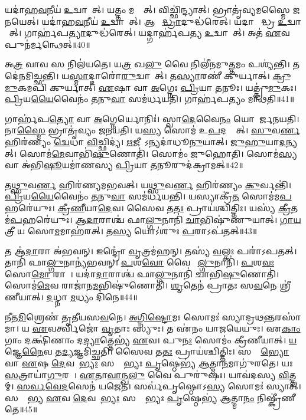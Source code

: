 𑌯𑌦𑌾॑𑌹\ul{𑌵}𑌨𑍀𑌯॑ \ul{𑌉}𑌦𑍍𑌵𑌾𑌯𑍇᳚𑌤𑍍।
𑌯𑌤𑍍𑌤𑌂 𑌮𑌨𑍍𑌥𑍇᳚𑌤𑍍।
𑌵𑌿𑌚𑍍𑌛𑌿॑𑌨𑍍𑌦𑍍𑌯𑌾𑌤𑍍।
𑌭𑍍𑌰𑌾𑌤𑍃॑𑌵𑍍𑌯𑌮𑌸𑍍𑌮𑍈 𑌜𑌨𑌯𑍇𑌤𑍍।
𑌯𑌦𑌾॑𑌹\ul{𑌵}𑌨𑍀𑌯॑ \ul{𑌉}𑌦𑍍𑌵𑌾𑌯𑍇᳚𑌤𑍍।
𑌆𑌗𑍍𑌨𑍀᳚\ul{𑌦𑍍𑌧𑍍𑌰𑌾}𑌦𑍁𑌦𑍍𑌧॑\-𑌰𑍇𑌤𑍍।
𑌯𑌦𑌾𑌗𑍍𑌨𑍀᳚𑌦𑍍𑌧𑍍𑌰 \ul{𑌉}𑌦𑍍𑌵𑌾𑌯𑍇᳚𑌤𑍍।
𑌗𑌾𑌰𑍍\mbox{}𑌹॑𑌪\ul{𑌤𑍍𑌯𑌾}𑌦𑍁𑌦𑍍𑌧॑𑌰𑍇𑌤𑍍।
𑌯𑌦𑍍𑌗𑌾𑌰𑍍\mbox{}𑌹॑𑌪𑌤𑍍𑌯 \ul{𑌉}𑌦𑍍𑌵𑌾𑌯𑍇᳚𑌤𑍍।
𑌅𑌤॑ \ul{𑌏}𑌵 𑌪𑍁𑌨॑𑌰𑍍𑌮𑌨𑍍𑌥𑍇𑌤𑍍॥40॥

𑌅\ul{𑌤𑍍𑌰} 𑌵𑌾𑌵 𑌸 𑌨𑌿𑌲॑𑌯𑌤𑍇।
𑌯\ul{𑌤𑍍𑌰} 𑌖\ul{𑌲𑍁} 𑌵𑍈 𑌨𑌿𑌲𑍀॑𑌨𑌮𑍁\ul{𑌤𑍍𑌤}𑌮𑌂 𑌪𑌶𑍍𑌯॑𑌨𑍍𑌤𑌿।
𑌤𑌦𑍇॑𑌨𑌮𑌿𑌚𑍍𑌛𑌨𑍍𑌤𑌿।
𑌯\ul{𑌸𑍍𑌮𑌾}𑌦𑍍𑌦𑌾𑌰𑍋॑\ul{𑌰𑍁}𑌦𑍍𑌵𑌾𑌯𑍇᳚𑌤𑍍।
𑌤\ul{𑌸𑍍𑌯𑌾}𑌰𑌣𑍀॑ 𑌕𑍁𑌰𑍍𑌯𑌾𑌤𑍍।
\ul{𑌕𑍍𑌰𑍁}\ul{𑌮𑍁}𑌕𑌮𑌪𑌿॑ 𑌕𑍁𑌰𑍍𑌯𑌾𑌤𑍍।
\ul{𑌏}𑌷𑌾 𑌵𑌾 \ul{𑌅}𑌗𑍍𑌨𑍇𑌃 \ul{𑌪𑍍𑌰𑌿}𑌯𑌾 \ul{𑌤}𑌨𑍂𑌃।
𑌯𑌤𑍍𑌕𑍍𑌰𑍁॑\ul{𑌮𑍁}𑌕𑌃।
\ul{𑌪𑍍𑌰𑌿}𑌯\ul{𑌯𑍈}𑌵𑍈𑌨𑌂॑ \ul{𑌤}𑌨𑍁\ul{𑌵𑌾} 𑌸𑌮॑𑌰𑍍𑌧𑌯𑌤𑌿।
𑌗𑌾𑌰𑍍\mbox{}𑌹॑𑌪𑌤𑍍𑌯𑌂 𑌮𑌨𑍍𑌥𑌤𑌿॥41॥

𑌗𑌾𑌰𑍍\mbox{}𑌹॑𑌪\ul{𑌤𑍍𑌯𑍋} 𑌵𑌾 \ul{𑌅}𑌗𑍍𑌨𑍇𑌰𑍍𑌯𑍋𑌨𑌿𑌃॑।
𑌸𑍍𑌵𑌾\ul{𑌦𑍇}𑌵𑍈\ul{𑌨𑌂} 𑌯𑍋𑌨𑍇᳚𑌰𑍍𑌜𑌨𑌯𑌤𑌿।
𑌨𑌾\ul{𑌸𑍍𑌮𑍈} 𑌭𑍍𑌰𑌾𑌤𑍃॑𑌵𑍍𑌯𑌂 𑌜𑌨𑌯𑌤𑌿।
𑌯\ul{𑌸𑍍𑌯} 𑌸𑍋𑌮॑ 𑌉\ul{𑌪}𑌦𑌸𑍍𑌯𑍇᳚𑌤𑍍।
\ul{𑌸𑍁}𑌵\ul{𑌰𑍍𑌣}\ul{} 𑌹𑌿𑌰॑𑌣𑍍𑌯𑌂 \ul{𑌦𑍍𑌵𑍇}𑌧𑌾 \ul{𑌵𑌿}𑌚𑍍𑌛𑌿𑌦𑍍𑌯॑।
\ul{𑌋}\ul{𑌜𑍀}𑌷𑍇᳚\-𑌽𑌨𑍍𑌯𑌦𑌾॑𑌧𑍂\ul{𑌨𑍁}𑌯𑌾𑌤𑍍।
\ul{𑌜𑍁}\ul{𑌹𑍁}𑌯𑌾\ul{𑌦}𑌨𑍍𑌯𑌤𑍍।
𑌸𑍋𑌮॑\ul{𑌮𑍇}𑌵𑌾𑌭𑌿॑\ul{𑌷𑍁}𑌣𑍋𑌤𑌿॑।
𑌸𑍋𑌮𑌂॑ 𑌜𑍁𑌹𑍋𑌤𑌿।
𑌸𑍋𑌮॑\ul{𑌸𑍍𑌯} 𑌵𑌾 𑌅॑𑌭𑌿\ul{𑌷𑍂}𑌯𑌮𑌾॑𑌣𑌸𑍍𑌯 \ul{𑌪𑍍𑌰𑌿}𑌯𑌾 \ul{𑌤}𑌨𑍂𑌰𑍁𑌦॑𑌕𑍍𑌰𑌾𑌮𑌤𑍍॥42॥

𑌤\ul{𑌥𑍍𑌸𑍁}𑌵\ul{𑌰𑍍𑌣}\ul{} 𑌹𑌿𑌰॑𑌣𑍍𑌯𑌮𑌭𑌵𑌤𑍍।
𑌯\ul{𑌥𑍍𑌸𑍁}𑌵\ul{𑌰𑍍𑌣}\ul{} 𑌹𑌿𑌰॑𑌣𑍍𑌯𑌂 \ul{𑌕𑍁}𑌰𑍍𑌵𑌨𑍍𑌤𑌿॑।
\ul{𑌪𑍍𑌰𑌿}𑌯\ul{𑌯𑍈}𑌵𑍈𑌨𑌂॑ \ul{𑌤}𑌨𑍁\ul{𑌵𑌾} 𑌸𑌮॑𑌰𑍍𑌧𑌯𑌨𑍍𑌤𑌿।
𑌯𑌸𑍍𑌯𑌾𑌕𑍍𑌰𑍀॑\ul{𑌤}\ul{} 𑌸𑍋𑌮॑𑌮\ul{𑌪}𑌹𑌰𑍇॑𑌯𑍁𑌃।
\ul{𑌕𑍍𑌰𑍀}\ul{𑌣𑍀}𑌯𑌾\ul{𑌦𑍇}𑌵।
𑌸𑍈𑌵 𑌤\ul{𑌤𑌃} 𑌪𑍍𑌰𑌾𑌯॑𑌶𑍍𑌚𑌿𑌤𑍍𑌤𑌿𑌃।
𑌯𑌸𑍍𑌯॑ \ul{𑌕𑍍𑌰𑍀}𑌤𑌮॑\ul{𑌪}𑌹𑌰𑍇॑𑌯𑍁𑌃।
\ul{𑌆}\ul{𑌦𑌾}𑌰𑌾𑌶𑍍𑌚॑ 𑌫𑌾\ul{𑌲𑍍𑌗𑍁}𑌨𑌾𑌨𑌿॑ \ul{𑌚𑌾}𑌭𑌿𑌷𑍁॑𑌣𑍁𑌯𑌾𑌤𑍍।
\ul{𑌗𑌾}\ul{𑌯}𑌤𑍍𑌰𑍀 𑌯 𑌸𑍋\ul{𑌮}𑌮𑌾𑌹॑𑌰𑌤𑍍।
𑌤\ul{𑌸𑍍𑌯} 𑌯𑍋𑌽॑𑌶𑍁𑌃 \ul{𑌪}𑌰𑌾\-𑌽𑌪॑𑌤𑌤𑍍॥43॥

𑌤 𑌆॑\ul{𑌦𑌾}𑌰𑌾 𑌅॑𑌭𑌵𑌨𑍍।
𑌇𑌨𑍍𑌦𑍍𑌰𑍋॑ \ul{𑌵𑍃}𑌤𑍍𑌰𑌮॑𑌹𑌨𑍍।
𑌤𑌸𑍍𑌯॑ \ul{𑌵}𑌲𑍍𑌕𑌃 𑌪𑌰𑌾॑\-𑌽𑌪𑌤𑌤𑍍।
𑌤𑌾𑌨𑌿॑ 𑌫𑌾\ul{𑌲𑍍𑌗𑍁}𑌨𑌾𑌨𑍍𑌯॑𑌭𑌵𑌨𑍍।
\ul{𑌪}𑌶\ul{𑌵𑍋} 𑌵𑍈 𑌫𑌾᳚\ul{𑌲𑍍𑌗𑍁}𑌨𑌾𑌨𑌿॑।
\ul{𑌪}𑌶\ul{𑌵𑌃} 𑌸𑍋\ul{𑌮𑍋} 𑌰𑌾𑌜𑌾᳚।
𑌯𑌦𑌾॑\ul{𑌦𑌾}𑌰𑌾𑌶𑍍𑌚॑ 𑌫𑌾\ul{𑌲𑍍𑌗𑍁}𑌨𑌾𑌨𑌿॑ 𑌚𑌾𑌭𑌿\ul{𑌷𑍁}𑌣𑍋𑌤𑌿॑।
𑌸𑍋𑌮॑\ul{𑌮𑍇}𑌵 𑌰𑌾𑌜𑌾॑𑌨\ul{𑌮}𑌭𑌿𑌷𑍁॑𑌣𑍋𑌤𑌿।
\ul{𑌶𑍃}𑌤𑍇𑌨॑ 𑌪𑍍𑌰𑌾𑌤𑌃 𑌸\ul{𑌵}𑌨𑍇 𑌶𑍍𑌰𑍀॑𑌣𑍀𑌯𑌾𑌤𑍍।
\ul{𑌦}𑌧𑍍𑌨𑌾 \ul{𑌮}𑌧𑍍𑌯𑌂 𑌦𑌿॑𑌨𑍇॥44॥

\ul{𑌨𑍀}\ul{𑌤}\ul{𑌮𑌿}𑌶𑍍𑌰𑍇𑌣॑ 𑌤𑍃𑌤𑍀𑌯𑌸\ul{𑌵}𑌨𑍇।
\ul{𑌅}\ul{𑌗𑍍𑌨𑌿}\ul{𑌷𑍍𑌟𑍋}𑌮𑌃 𑌸𑍋𑌮𑌃॑ 𑌸𑍍𑌯𑌾𑌦𑍍𑌰𑌥\ul{𑌨𑍍𑌤}𑌰\-𑌸𑌾॑𑌮𑌾।
𑌯 \ul{𑌏}𑌵𑌰𑍍𑌤𑍍𑌵𑌿𑌜𑍋॑ \ul{𑌵𑍃}𑌤𑌾𑌃 𑌸𑍍𑌯𑍁𑌃।
𑌤 𑌏॑𑌨𑌂 𑌯𑌾𑌜𑌯𑍇𑌯𑍁𑌃।
𑌏\ul{𑌕𑌾𑌂} 𑌗𑌾𑌂 𑌦𑌕𑍍𑌷𑌿॑𑌣𑌾𑌂 𑌦\ul{𑌦𑍍𑌯𑌾}𑌤𑍍𑌤𑍇𑌭𑍍𑌯॑ \ul{𑌏}𑌵।
𑌪𑍁\ul{𑌨𑌃} 𑌸𑍋𑌮𑌂॑ 𑌕𑍍𑌰𑍀𑌣𑍀𑌯𑌾𑌤𑍍।
\ul{𑌯}𑌜𑍍𑌞𑍇\ul{𑌨𑍈}𑌵 𑌤\ul{𑌦𑍍𑌯}𑌜𑍍𑌞𑌮𑌿॑𑌚𑍍𑌛𑌤𑌿।
𑌸𑍈𑌵 𑌤\ul{𑌤𑌃} 𑌪𑍍𑌰𑌾𑌯॑𑌶𑍍𑌚𑌿𑌤𑍍𑌤𑌿𑌃।
𑌸𑌰𑍍𑌵𑌾᳚\ul{𑌭𑍍𑌯𑍋} 𑌵𑌾 \ul{𑌏}𑌷 \ul{𑌦𑍇}𑌵𑌤𑌾᳚\ul{𑌭𑍍𑌯𑌃} 𑌸𑌰𑍍𑌵𑍇᳚𑌭𑍍𑌯𑌃 \ul{𑌪𑍃}𑌷𑍍𑌠𑍇𑌭𑍍𑌯॑ \ul{𑌆}𑌤𑍍𑌮𑌾\ul{𑌨}𑌮𑌾𑌗𑍁॑𑌰𑌤𑍇।
𑌯𑌃 \ul{𑌸}𑌤𑍍𑌰𑌾𑌯𑌾॑\ul{𑌗𑍁}𑌰𑌤𑍇᳚।
\ul{𑌏}𑌤𑌾\ul{𑌵𑌾}𑌨𑍍𑌖\ul{𑌲𑍁} 𑌵𑍈 𑌪𑍁𑌰𑍁॑𑌷𑌃।
𑌯𑌾𑌵॑𑌦𑌸𑍍𑌯 \ul{𑌵𑌿}𑌤𑍍𑌤𑌮𑍍।
\ul{𑌸}\ul{𑌰𑍍𑌵}\ul{𑌵𑍇}\ul{𑌦}𑌸𑍇𑌨॑ 𑌯𑌜𑍇𑌤।
𑌸𑌰𑍍𑌵॑𑌪𑍃𑌷𑍍𑌠𑍋\-𑌽\ul{𑌸𑍍𑌯} 𑌸𑍋𑌮𑌃॑ 𑌸𑍍𑌯𑌾𑌤𑍍।
𑌸𑌰𑍍𑌵𑌾᳚𑌭𑍍𑌯 \ul{𑌏}𑌵 \ul{𑌦𑍇}𑌵𑌤𑌾᳚\ul{𑌭𑍍𑌯𑌃} 𑌸𑌰𑍍𑌵𑍇᳚𑌭𑍍𑌯𑌃 \ul{𑌪𑍃}𑌷𑍍𑌠𑍇𑌭𑍍𑌯॑ \ul{𑌆}𑌤𑍍𑌮𑌾\ul{𑌨𑌂} 𑌨𑌿𑌷𑍍𑌕𑍍𑌰𑍀॑𑌣𑍀𑌤𑍇॥45॥\anuvakamend[\ul{𑌉}𑌦𑍍𑌵𑌾𑌯॑𑌤𑌿 𑌮𑌨𑍍𑌥𑍇𑌨𑍍𑌮𑌨𑍍𑌥𑌤𑍍𑌯𑌕𑍍𑌰𑌾𑌮\ul{𑌤𑍍𑌪}𑌰𑌾\-𑌽𑌪॑𑌤\ul{𑌨𑍍𑌮}𑌧𑍍𑌯𑌨𑍍𑌦𑌿॑𑌨 𑌆\ul{𑌗𑍁}𑌰\ul{𑌤𑍇} 𑌪𑌞𑍍𑌚॑ 𑌚]

